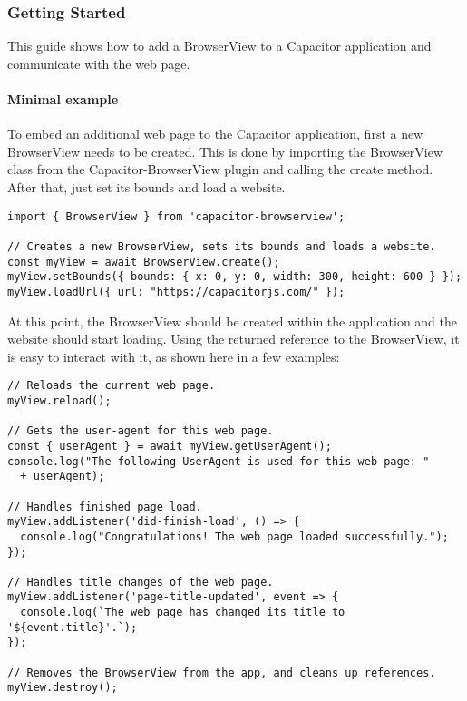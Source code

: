 \subsubsection{Getting Started}
\label{sec:Capacitor-BrowserView:GettingStarted}

This guide shows how to add a BrowserView to a Capacitor application and communicate with the web page.

\paragraph{Minimal example}
\label{sec:Capacitor-BrowserView:MinimalExample}

To embed an additional web page to the Capacitor application, first a new BrowserView needs to be created.
This is done by importing the BrowserView class from the Capacitor-BrowserView plugin and calling the create method.
After that, just set its bounds and load a website.

\begin{verbatim}
import { BrowserView } from 'capacitor-browserview';

// Creates a new BrowserView, sets its bounds and loads a website.
const myView = await BrowserView.create();
myView.setBounds({ bounds: { x: 0, y: 0, width: 300, height: 600 } });
myView.loadUrl({ url: "https://capacitorjs.com/" });
\end{verbatim}

At this point, the BrowserView should be created within the application and the website should start loading.
Using the returned reference to the BrowserView, it is easy to interact with it, as shown here in a few examples:

\begin{verbatim}
// Reloads the current web page.
myView.reload();

// Gets the user-agent for this web page.
const { userAgent } = await myView.getUserAgent();
console.log("The following UserAgent is used for this web page: "
  + userAgent);

// Handles finished page load.
myView.addListener('did-finish-load', () => {
  console.log("Congratulations! The web page loaded successfully.");
});

// Handles title changes of the web page.
myView.addListener('page-title-updated', event => {
  console.log(`The web page has changed its title to '${event.title}'.`);
});

// Removes the BrowserView from the app, and cleans up references.
myView.destroy();
\end{verbatim}

